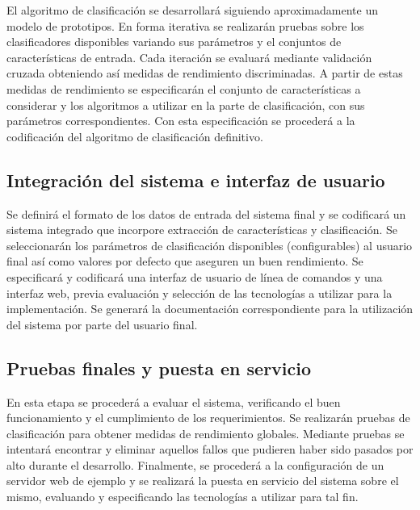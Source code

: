 \documentclass[12pt,bibliography=openstyle,DIV=12,parskip=full-]{scrartcl}
\begin{document}
El algoritmo de clasificación se desarrollará siguiendo
aproximadamente un modelo de prototipos. En forma iterativa se
realizarán pruebas sobre los clasificadores disponibles variando sus
parámetros y el conjuntos de características de entrada. Cada
iteración se evaluará mediante validación cruzada obteniendo así
medidas de rendimiento discriminadas. A partir de estas medidas de
rendimiento se especificarán el conjunto de características a
considerar y los algoritmos a utilizar en la parte de clasificación,
con sus parámetros correspondientes. Con esta especificación se procederá
a la codificación del algoritmo de clasificación definitivo.
%
%
\subsection{Integración del sistema e interfaz de usuario}
Se definirá el formato de los datos de entrada del sistema final y se
codificará un sistema integrado que incorpore extracción de
características y clasificación. Se seleccionarán los parámetros de
clasificación disponibles (configurables) al usuario final así como
valores por defecto que aseguren un buen rendimiento.
%
Se especificará y codificará una interfaz de usuario de línea de
comandos y una interfaz web, previa evaluación y selección de las
tecnologías a utilizar para la implementación.  Se generará la
documentación correspondiente para la utilización del sistema por
parte del usuario final.
%
\subsection{Pruebas finales y puesta en servicio}
En esta etapa se procederá a evaluar el sistema, verificando el buen
funcionamiento y el cumplimiento de los requerimientos. Se realizarán
pruebas de clasificación para obtener medidas de rendimiento
globales. Mediante pruebas se intentará encontrar y eliminar
aquellos fallos que pudieren haber sido pasados por alto durante el
desarrollo.
%
Finalmente, se procederá a la configuración de un servidor web de
ejemplo y se realizará la puesta en servicio del sistema sobre el
mismo, evaluando y especificando las tecnologías a utilizar para tal
fin.
%
%
\newpage
\end{document}
